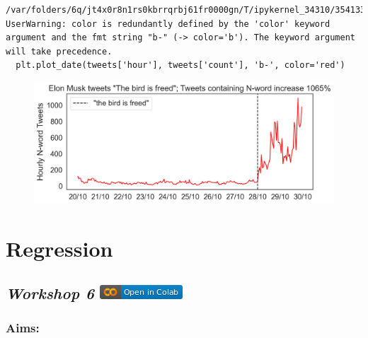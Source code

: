 \documentclass[
  letterpaper,
  DIV=11,
  numbers=noendperiod]{scrreprt}
\begin{document}
\begin{verbatim}
/var/folders/6q/jt4x0r8n1rs0kbrrqrbj61fr0000gn/T/ipykernel_34310/354133693.py:17: UserWarning: color is redundantly defined by the 'color' keyword argument and the fmt string "b-" (-> color='b'). The keyword argument will take precedence.
  plt.plot_date(tweets['hour'], tweets['count'], 'b-', color='red')
\end{verbatim}

\begin{figure}[H]

{\centering \includegraphics{notebooks/W07. Distributions and Basic Statistics_files/figure-pdf/cell-42-output-2.png}

}

\end{figure}


\hypertarget{regression}{%
\chapter{Regression}\label{regression}}

\hypertarget{workshop-6-open-in-colab}{%
\section[\emph{Workshop 6} ]{\texorpdfstring{\emph{Workshop 6}
\href{https://colab.research.google.com/github/oballinger/QM2/blob/main/notebooks/W09.\%20Linear\%20Regression.ipynb}{\protect\includegraphics{index_files/mediabag/colab-badge.png}}}{Workshop 6 Open In Colab}}\label{workshop-6-open-in-colab}}

\hypertarget{aims-4}{%
\subsection{Aims:}\label{aims-4}}
\end{document}
